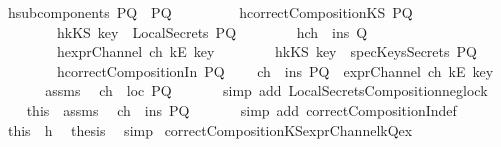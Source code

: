 \begin{isabellebody}
\ h{}{\isacharcolon}{\isachardoublequoteopen}subcomponents\ PQ\ {\isacharequal}\ {\isacharbraceleft}P{\isacharcomma}Q{\isacharbraceright}{\isachardoublequoteclose}\ \isanewline
\ \ \ \ \ \ \ \ h{}{\isacharcolon}{\isachardoublequoteopen}correctCompositionKS\ PQ{\isachardoublequoteclose}\isanewline
\ \ \ \ \ \ \ \ h{}{\isacharcolon}{\isachardoublequoteopen}kKS\ key\ {\isasymnotin}\ LocalSecrets\ PQ{\isachardoublequoteclose}\isanewline
\ \ \ \ \ \ \ \ h{}{\isacharcolon}{\isachardoublequoteopen}ch\ {\isasymin}\ ins\ Q{\isachardoublequoteclose}\isanewline
\ \ \ \ \ \ \ \ h{}{\isacharcolon}{\isachardoublequoteopen}exprChannel\ ch\ {\isacharparenleft}kE\ key{\isacharparenright}{\isachardoublequoteclose}\isanewline
\ \ \ \ \ \ \ \ h{}{\isacharcolon}{\isachardoublequoteopen}kKS\ key\ {\isasymnotin}\ specKeysSecrets\ PQ{\isachardoublequoteclose}\isanewline
\ \ \ \ \ \ \ \ h{}{\isacharcolon}{\isachardoublequoteopen}correctCompositionIn\ PQ{\isachardoublequoteclose}\isanewline
{}\ \ \ \ {\isachardoublequoteopen}ch\ {\isasymin}\ ins\ PQ\ {\isasymand}\ exprChannel\ ch\ {\isacharparenleft}kE\ key{\isacharparenright}{\isachardoublequoteclose}\isanewline
%
\isadelimproof
%
\endisadelimproof
%
\isatagproof
{}\isamarkupfalse%
\ {\isacharminus}\ \isanewline
\ \ \isamarkupfalse%
\ assms\ \isamarkupfalse%
\ {\isachardoublequoteopen}ch\ {\isasymnotin}\ loc\ PQ{\isachardoublequoteclose}\ \isanewline
\ \ \ \ \isamarkupfalse%
\ {\isacharparenleft}simp\ add{\isacharcolon}\ LocalSecretsComposition{\isacharunderscore}neg{\isacharunderscore}loc{\isacharunderscore}k{\isacharparenright}\isanewline
\ \ \isamarkupfalse%
\ this\ \ assms\ \isamarkupfalse%
\ {\isachardoublequoteopen}ch\ {\isasymin}\ ins\ PQ{\isachardoublequoteclose}\ \isanewline
\ \ \ \ \isamarkupfalse%
\ {\isacharparenleft}simp\ add{\isacharcolon}\ correctCompositionIn{\isacharunderscore}def{\isacharparenright}\ \isanewline
\ \ \isamarkupfalse%
\ this\ \ h{}\ \isamarkupfalse%
\ {\isacharquery}thesis\ \isamarkupfalse%
\ simp\isanewline
{}\isamarkupfalse%
%
\endisatagproof
{\isafoldproof}%
%
\isadelimproof
\isanewline
%
\endisadelimproof
\isanewline
{}\isamarkupfalse%
\ correctCompositionKS{\isacharunderscore}exprChannel{\isacharunderscore}k{\isacharunderscore}Qex{\isacharcolon}\isanewline

\end{isabellebody}
